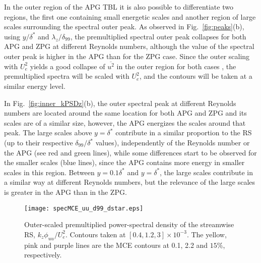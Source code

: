 
In the outer region of the APG TBL it is also possible to differentiate two regions, the first one containing small energetic scales and another region of large scales surrounding the spectral outer peak.
As observed in Fig.~\ref{fig:peaks}(b), using $y/\delta^*$ and $\lambda_z/\delta_{99}$, the premultiplied spectral outer peak collapses for both APG and ZPG at different Reynolds numbers, although the value of the spectral outer peak is higher in the APG than for the ZPG case.
Since the outer scaling with $U_e^2$ yields a good collapse of $\overline{u^2}$ in the outer region for both cases \cite{Pozuelo_JFM_22}, the premultiplied spectra will be scaled with $U_e^2$, and the contours will be taken at a similar energy level.



In Fig.~\ref{fig:inner_kPSDz}(b), the outer spectral peak at different Reynolds numbers are located around the same location for both APG and ZPG and its scales are of a similar size, however, the APG energizes the scales around that peak.
The large scales above $y=\delta^*$ contribute in a similar proportion to the RS (up to their respective $\delta_{99}/\delta^*$ values), independently of the Reynolds number or the APG (see red and green lines), while some differences start to be observed for the smaller scales (blue lines), since the APG contains more energy in smaller scales in this region. 
Between $y=0.1\delta^*$ and $y=\delta^*$, the large scales contribute in a similar way at different Reynolds numbers, but the relevance of the large scales is greater in the APG than in the ZPG. 
\begin{figure}
\centering
\texttt{[image: specMCE\_uu\_d99\_dstar.eps]}
\caption{ \label{fig:cont_cumsum_d99_dstar} Outer-scaled premultiplied power-spectral density of the streamwise RS, $k_z\phi_{uu}/U_e^2$. Contours taken at $[0.4, 1.2, 3] \times 10^{-3}$. The yellow, pink and purple lines are the MCE contours at 0.1, 2.2 and $15\%$, respectively.}
\end{figure}

